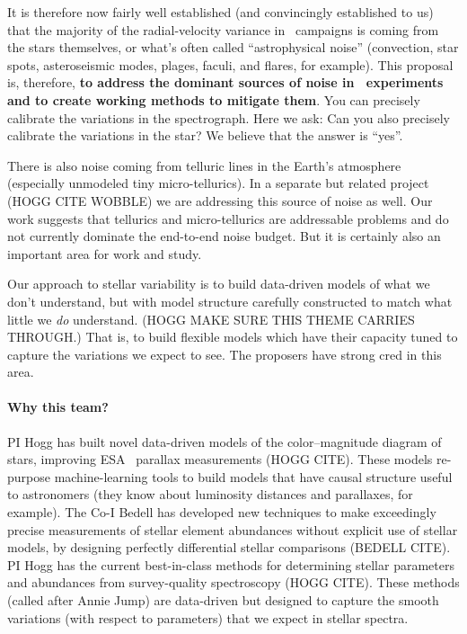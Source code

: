 \documentclass[12pt, letterpaper]{article}
\begin{document}
It is therefore now fairly well established (and convincingly
established to us) that the majority of the radial-velocity variance
in \EPRV\ campaigns is coming from the stars themselves, or what's
often called ``astrophysical noise'' (convection, star spots,
asteroseismic modes, plages, faculi, and flares, for example).
This proposal is, therefore, \textbf{to address the dominant sources of
  noise in \EPRV\ experiments and to create working methods to
  mitigate them}.
You can precisely calibrate the variations in the spectrograph.
Here we ask: Can you also precisely calibrate the variations in the star?
We believe that the answer is ``yes''.

There is also noise coming from telluric lines in the Earth's atmosphere
(especially unmodeled tiny micro-tellurics).
In a separate but related project (HOGG CITE WOBBLE) we are addressing this
source of noise as well.
Our work suggests that tellurics and micro-tellurics are addressable problems
and do not currently dominate the end-to-end noise budget.
But it is certainly also an important area for work and study.

Our approach to stellar variability is to build data-driven models of what
we don't understand, but with model structure carefully constructed to
match what little we \emph{do} understand. (HOGG MAKE SURE THIS THEME CARRIES THROUGH.)
That is, to build flexible models which have their capacity tuned to
capture the variations we expect to see.
The proposers have strong cred in this area.

\paragraph{Why this team?}
PI Hogg has built novel data-driven models of the color--magnitude diagram of
stars, improving ESA \Gaia\ parallax measurements (HOGG CITE).
These models re-purpose machine-learning tools to build models that
have causal structure useful to astronomers (they know about
luminosity distances and parallaxes, for example).
The Co-I Bedell has developed new techniques to make exceedingly
precise measurements of stellar element abundances without explicit
use of stellar models, by designing perfectly differential stellar
comparisons (BEDELL CITE).
PI Hogg has the current best-in-class methods for determining stellar
parameters and abundances from survey-quality spectroscopy (HOGG
CITE).
These methods (called  after Annie Jump) are
data-driven but designed to capture the smooth variations (with
respect to parameters) that we expect in stellar spectra.
\end{document}
